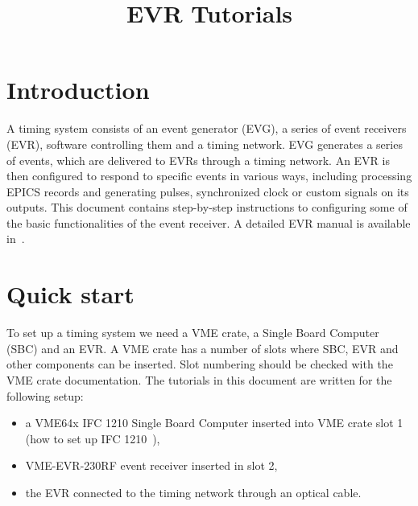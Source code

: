\documentclass[12pt,a4paper]{article}
\title{EVR Tutorials}
\date{}
\begin{document}
\maketitle

\tableofcontents
\newpage

\section{Introduction}
A timing system consists of an event generator (EVG), a series of event receivers (EVR), software controlling them and a timing network. EVG generates a series of events, which are delivered to EVRs through a timing network. An EVR is then configured to respond to specific events in various ways, including processing EPICS records and generating pulses, synchronized clock or custom signals on its outputs.
This document contains step-by-step instructions to configuring some of the basic functionalities of the event receiver. A detailed EVR manual is available in~\cite{evr_manual}.

\section{Quick start}\label{sec:Quick start}
To set up a timing system we need a VME crate, a Single Board Computer (SBC) and an EVR. A VME crate has a number of slots where SBC, EVR and other components can be inserted. Slot numbering should be checked with the VME crate documentation. The tutorials in this document are written for the following setup:
\begin{itemize}
	\item a VME64x IFC 1210 Single Board Computer inserted into VME crate slot 1 (how to set up IFC 1210~\cite{ifc}),
	\item VME-EVR-230RF event receiver inserted in slot 2,
	\item the EVR connected to the timing network through an optical cable.
\end{itemize}
\end{document}
